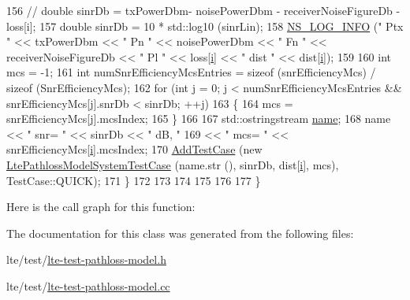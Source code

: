 \begin{DoxyCode}
156     \textcolor{comment}{//     double sinrDb = txPowerDbm- noisePowerDbm - receiverNoiseFigureDb - loss[i];}
157     \textcolor{keywordtype}{double} sinrDb = 10 * std::log10 (sinrLin);
158     \hyperlink{group__logging_gafbd73ee2cf9f26b319f49086d8e860fb}{NS\_LOG\_INFO} (\textcolor{stringliteral}{" Ptx "} << txPowerDbm << \textcolor{stringliteral}{" Pn "} << noisePowerDbm << \textcolor{stringliteral}{" Fn "} << 
      receiverNoiseFigureDb << \textcolor{stringliteral}{" Pl "} << loss[\hyperlink{bernuolliDistribution_8m_a6f6ccfcf58b31cb6412107d9d5281426}{i}] << \textcolor{stringliteral}{" dist "} << dist[\hyperlink{bernuolliDistribution_8m_a6f6ccfcf58b31cb6412107d9d5281426}{i}]);
159 
160     \textcolor{keywordtype}{int} mcs = -1;
161     \textcolor{keywordtype}{int} numSnrEfficiencyMcsEntries = \textcolor{keyword}{sizeof} (snrEfficiencyMcs) / \textcolor{keyword}{sizeof} (SnrEfficiencyMcs);
162     \textcolor{keywordflow}{for} (\textcolor{keywordtype}{int} j = 0; j < numSnrEfficiencyMcsEntries && snrEfficiencyMcs[j].snrDb < sinrDb; ++j)
163       \{
164         mcs = snrEfficiencyMcs[j].mcsIndex;
165       \}
166 
167     std::ostringstream \hyperlink{generate__test__data__lte__spectrum__model_8m_ab74e6bf80237ddc4109968cedc58c151}{name};
168     name << \textcolor{stringliteral}{" snr= "} << sinrDb << \textcolor{stringliteral}{" dB, "}
169          << \textcolor{stringliteral}{" mcs= "} << snrEfficiencyMcs[\hyperlink{bernuolliDistribution_8m_a6f6ccfcf58b31cb6412107d9d5281426}{i}].mcsIndex;
170     \hyperlink{classns3_1_1TestCase_a3718088e3eefd5d6454569d2e0ddd835}{AddTestCase} (\textcolor{keyword}{new} \hyperlink{classLtePathlossModelSystemTestCase}{LtePathlossModelSystemTestCase} (name.str (), 
       sinrDb, dist[\hyperlink{bernuolliDistribution_8m_a6f6ccfcf58b31cb6412107d9d5281426}{i}], mcs), TestCase::QUICK);
171   \}
172 
173 
174 
175 
176   
177 \}
\end{DoxyCode}


Here is the call graph for this function\+:




The documentation for this class was generated from the following files\+:\begin{DoxyCompactItemize}
\item 
lte/test/\hyperlink{lte-test-pathloss-model_8h}{lte-\/test-\/pathloss-\/model.\+h}\item 
lte/test/\hyperlink{lte-test-pathloss-model_8cc}{lte-\/test-\/pathloss-\/model.\+cc}\end{DoxyCompactItemize}
